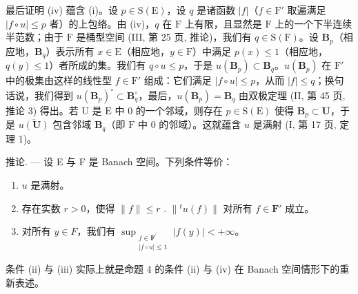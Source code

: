 最后证明 (iv) 蕴含 (i)。设 \(p \in \mathrm{S}(\mathrm{E})\)，设 \(q\) 是诸函数 \(|f|\)（\(f \in \mathrm{F}'\) 取遍满足 \(|f \circ u| \leqslant p\) 者）的上包络。由 (iv)，\(q\) 在 \(\mathrm{F}\) 上有限，且显然是 \(\mathrm{F}\) 上的一个下半连续半范数；由于 \(\mathrm{F}\) 是桶型空间 (III, 第 25 页, 推论)，我们有 \(q \in \mathrm{S}(\mathrm{F})\)。设 \(\mathbf{B}_p\)（相应地，\(\mathbf{B}_q\)）表示所有 \(x \in \mathrm{E}\)（相应地，\(y \in \mathrm{F}\)）中满足 \(p(x) \leqslant 1\)（相应地，\(q(y) \leqslant 1\)）者所成的集。我们有 \(q \circ u \leqslant p\)，于是 \(u(\mathbf{B}_p) \subset \mathbf{B}_q\)。\(u(\mathbf{B}_p)\) 在 \(\mathrm{F}'\) 中的极集由这样的线性型 \(f \in \mathrm{F}'\) 组成：它们满足 \(|f \circ u| \leqslant p\)，从而 \(|f| \leqslant q\)；换句话说，我们得到 \(u(\mathbf{B}_p)^{\circ} \subset \mathbf{B}_q^{\circ}\)，最后，\(\overline{u(\mathbf{B}_p)} = \mathbf{B}_q\) 由双极定理 (II, 第 45 页, 推论 3) 得出。若 \(\mathrm{U}\) 是 \(\mathrm{E}\) 中 0 的一个邻域，则存在 \(p \in \mathrm{S}(\mathrm{E})\) 使得 \(\mathbf{B}_p \subset \mathbf{U}\)，于是 \(\overline{u(\mathbf{U})}\) 包含邻域 \(\mathbf{B}_q\)（即 \(\mathrm{F}\) 中 0 的邻域）。这就蕴含 \(u\) 是满射 (I, 第 17 页, 定理 1)。

推论. --- 设 E 与 F 是 Banach 空间。下列条件等价：

\begin{enumerate}
\def\labelenumi{(\roman{enumi})}
\item
  \(u\) 是满射。
\item
  存在实数 \(r > 0\)，使得 \(\| f \| \leqslant r\) . \(\| {}^t u(f) \|\) 对所有 \(f \in \mathbf{F}'\) 成立。
\item
  对所有 \(y \in F\)，我们有 \(\sup_{\substack{f\in \mathbf{F}^{\prime}\\ |f\circ u|\leqslant 1}} |f(y)| < +\infty\)。
\end{enumerate}

条件 (ii) 与 (iii) 实际上就是命题 4 的条件 (ii) 与 (iv) 在 Banach 空间情形下的重新表述。

